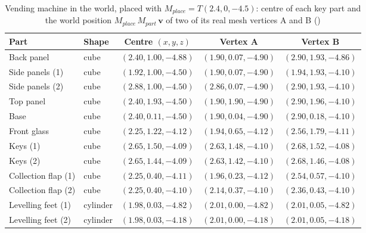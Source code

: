 \begin{table}[H]\centering\footnotesize
\caption{Vending machine in the world, placed with $M_{place}=T(2.4, 0, -4.5)$: centre of each key part and the world position $M_{place}\,M_{part}\,\mathbf{v}$ of two of its real mesh vertices A and B ()}\label{tab:world_vending}
\begin{tabular}{@{}l l c c c@{}}
\toprule
Part & Shape & Centre $(x,y,z)$ & Vertex A & Vertex B \\
\midrule
Back panel & cube & $(2.40, 1.00, -4.88)$ & $(1.90, 0.07, -4.90)$ & $(2.90, 1.93, -4.86)$ \\
Side panels (1) & cube & $(1.92, 1.00, -4.50)$ & $(1.90, 0.07, -4.90)$ & $(1.94, 1.93, -4.10)$ \\
Side panels (2) & cube & $(2.88, 1.00, -4.50)$ & $(2.86, 0.07, -4.90)$ & $(2.90, 1.93, -4.10)$ \\
Top panel & cube & $(2.40, 1.93, -4.50)$ & $(1.90, 1.90, -4.90)$ & $(2.90, 1.96, -4.10)$ \\
Base & cube & $(2.40, 0.11, -4.50)$ & $(1.90, 0.04, -4.90)$ & $(2.90, 0.18, -4.10)$ \\
Front glass & cube & $(2.25, 1.22, -4.12)$ & $(1.94, 0.65, -4.12)$ & $(2.56, 1.79, -4.11)$ \\
Keys (1) & cube & $(2.65, 1.50, -4.09)$ & $(2.63, 1.48, -4.10)$ & $(2.68, 1.52, -4.08)$ \\
Keys (2) & cube & $(2.65, 1.44, -4.09)$ & $(2.63, 1.42, -4.10)$ & $(2.68, 1.46, -4.08)$ \\
Collection flap (1) & cube & $(2.25, 0.40, -4.11)$ & $(1.96, 0.23, -4.12)$ & $(2.54, 0.57, -4.10)$ \\
Collection flap (2) & cube & $(2.25, 0.40, -4.10)$ & $(2.14, 0.37, -4.10)$ & $(2.36, 0.43, -4.10)$ \\
Levelling feet (1) & cylinder & $(1.98, 0.03, -4.82)$ & $(2.01, 0.00, -4.82)$ & $(2.01, 0.05, -4.82)$ \\
Levelling feet (2) & cylinder & $(1.98, 0.03, -4.18)$ & $(2.01, 0.00, -4.18)$ & $(2.01, 0.05, -4.18)$ \\
\bottomrule
\end{tabular}
\end{table}
